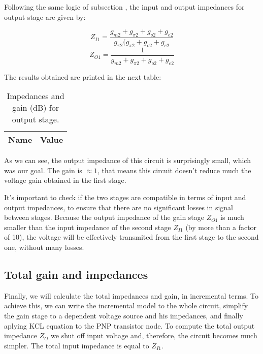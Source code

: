  \par Following the same logic of subsection \label{subsec:inc1}, the input and output impedances for output stage are given by:
 
 \begin{equation}
 Z_{I1}= \frac{g_{m2}+g_{\pi 2}+g_{o2}+g_{e2}}{g_{\pi 2}(g_{\pi 2}+g_{o2}+g_{e2}}
 \end{equation}
  \begin{equation}
 Z_{O1} = \frac{1}{g_{m2}+g_{\pi 2}+g_{o2}+g_{e2}}
 \end{equation}
 
 \par The results obtained are printed in the next table:
 
 \begin{table}[H]
    \centering
    \begin{tabular}{|l|r|}
    \hline    
    {\bf Name} & {\bf Value} \\ \hline
    
    \end{tabular}
     \caption{Impedances and gain (dB) for output stage.}
    \label{tab:inc2}
  \end{table}

\par As we can see, the output impedance of this circuit is surprisingly small, which was our goal. The gain is $\approx 1$, that means this circuit doesn't reduce much the voltage gain obtained in the first stage.

\par It's important to check if the two stages are compatible in terms of input and output impedances, to ensure that there are no significant losses in signal between stages. Because the output impedance of the gain stage $Z_{O1}$ is much smaller than the input impedance of the second stage $Z_{I1}$ (by more than a factor of 10), the voltage will be effectively transmited from the first stage to the second one, without many losses.

\subsection{Total gain and impedances}

\par Finally, we will calculate the total impedances and gain, in incremental terms. To achieve this, we can write the incremental model to the whole circuit, simplify the gain stage to a dependent voltage source and his impedances, and finally aplying KCL equation to the PNP transistor node. To compute the total output impedance $Z_O$ we shut off input voltage and, therefore, the circuit becomes much simpler. The total input impedance is equal to $Z_{I1}$.

